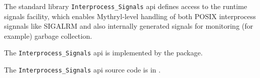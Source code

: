 
The standard library {\tt Interprocess\_Signals} api defines access to the runtime signals facility,
which enables Mythryl-level handling of both POSIX interprocess signnals like SIGALRM and also 
internally generated signals for monitoring (for example) garbage collection.

The {\tt Interprocess\_Signals} api is implemented by the  package.

The {\tt Interprocess\_Signals} api source code is in .

